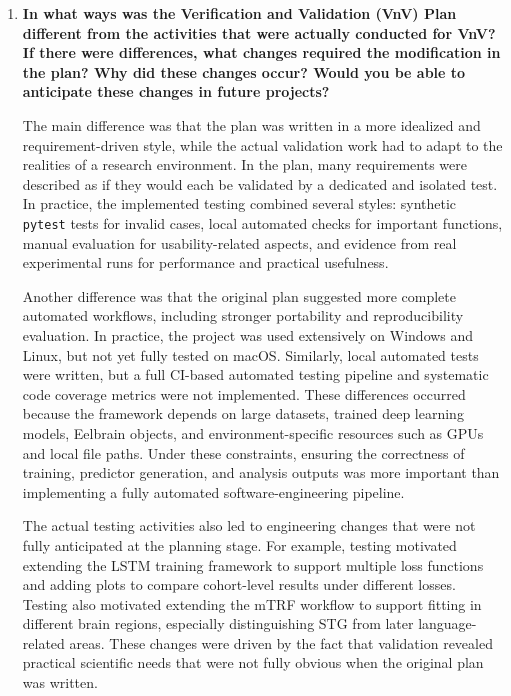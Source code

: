 \documentclass[12pt, titlepage]{article}
\begin{document}
\begin{enumerate}
  The emphasis on separating STG from later language-related regions in the mTRF workflow was also closely related to the intended neuroscience use case, which was clarified through domain discussions rather than derived only from software structure.



  \item \textbf{In what ways was the Verification and Validation (VnV) Plan different from the activities that were actually conducted for VnV? If there were differences, what changes required the modification in the plan? Why did these changes occur? Would you be able to anticipate these changes in future projects?}


  The main difference was that the plan was written in a more idealized and requirement-driven style, while the actual validation work had to adapt to the realities of a research environment.
  In the plan, many requirements were described as if they would each be validated by a dedicated and isolated test.
  In practice, the implemented testing combined several styles: synthetic \texttt{pytest} tests for invalid cases, local automated checks for important functions, manual evaluation for usability-related aspects, and evidence from real experimental runs for performance and practical usefulness.

  Another difference was that the original plan suggested more complete automated workflows, including stronger portability and reproducibility evaluation.
  In practice, the project was used extensively on Windows and Linux, but not yet fully tested on macOS.
  Similarly, local automated tests were written, but a full CI-based automated testing pipeline and systematic code coverage metrics were not implemented.
  These differences occurred because the framework depends on large datasets, trained deep learning models, Eelbrain objects, and environment-specific resources such as GPUs and local file paths.
  Under these constraints, ensuring the correctness of training, predictor generation, and analysis outputs was more important than implementing a fully automated software-engineering pipeline.

  The actual testing activities also led to engineering changes that were not fully anticipated at the planning stage.
  For example, testing motivated extending the LSTM training framework to support multiple loss functions and adding plots to compare cohort-level results under different losses.
  Testing also motivated extending the mTRF workflow to support fitting in different brain regions, especially distinguishing STG from later language-related areas.
  These changes were driven by the fact that validation revealed practical scientific needs that were not fully obvious when the original plan was written.


\end{enumerate}
\end{document}
